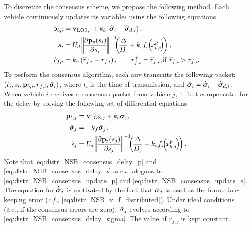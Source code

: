 To discretize the consensus scheme, we propose the following method.
Each vehicle continuously updates its variables using the following equations
\begin{align}
    \dot{\mat{p}}_{b, i} &= \ivel_{{\rm LOS}, i} + k_b\left(\widehat{\bs{\sigma}}_i - \widehat{\bs{\sigma}}_{d,i}\right), \label{eq:distr_NSB_consensus_update_p} \\
    \dot{s}_i &= U_{d\!} \norm{\!\frac{\partial \mat{p}_p(s_i)}{\partial s_i}\!}^{-1} \!\!\! \left(\!\frac{\Delta}{D_i} + k_s f_{s\!}\!\left(\!x_{b, i\!}^p\right)\!\right), \label{eq:distr_NSB_consensus_update_s} \\
    \dot{r}_{f, i} &= k_r \left(\widehat{r}_{f, i} - r_{f, i}\right), \qquad
    r_{f, i}^{+} = \widehat{r}_{f, i}, \text{if } \widehat{r}_{f, i} > r_{f, i}.
\end{align}
To perform the consensus algorithm, each \gls{auv} transmits the following packet: $\left(t_i, s_i, \mathbf{p}_{b, i}, r_{f, i}, \breve{\bm{\sigma}}_i \right)$, where $t_i$ is the time of transmission, and $\breve{\bm{\sigma}}_i = \widehat{\bm{\sigma}}_i - \widehat{\bm{\sigma}}_{d,i}$.
When vehicle $i$ receives a consensus packet from vehicle $j$, it first compensates for the delay by solving the following set of differential equations
\begin{subequations}
    \begin{align}
        \dot{\mat{p}}_{b, j} &= \ivel_{{\rm LOS}, j} + k_b \breve{\bs{\sigma}}_j, \label{eq:distr_NSB_consensus_delay_p} \\
        \dot{\breve{\bs{\sigma}}}_j &= - k_f \breve{\bs{\sigma}}_j, \label{eq:distr_NSB_consensus_delay_sigma} \\
        \dot{s}_j &= U_{d\!} \norm{\!\frac{\partial \mat{p}_p(s_j)}{\partial s_j}\!}^{-1} \!\!\! \left(\!\frac{\Delta}{D_j} + k_s f_{s\!}\!\left(\!x_{b, j\!}^p\right)\!\right). \label{eq:distr_NSB_consensus_delay_s}
    \end{align}
\end{subequations}
Note that \eqref{eq:distr_NSB_consensus_delay_p} and \eqref{eq:distr_NSB_consensus_delay_s} are analogous to \eqref{eq:distr_NSB_consensus_update_p} and \eqref{eq:distr_NSB_consensus_update_s}.
The equation for $\dot{\breve{\bm{\sigma}}}_j$ is motivated by the fact that $\breve{\bm{\sigma}}_j$ is used as the formation-keeping error (\emph{c.f.,} \eqref{eq:distr_NSB_v_f_distributed}).
Under ideal conditions (\emph{i.e.,} if the consensus errors are zero), $\breve{\bm{\sigma}}_j$ evolves according to \eqref{eq:distr_NSB_consensus_delay_sigma}.
The value of $r_{f, j}$ is kept constant.

